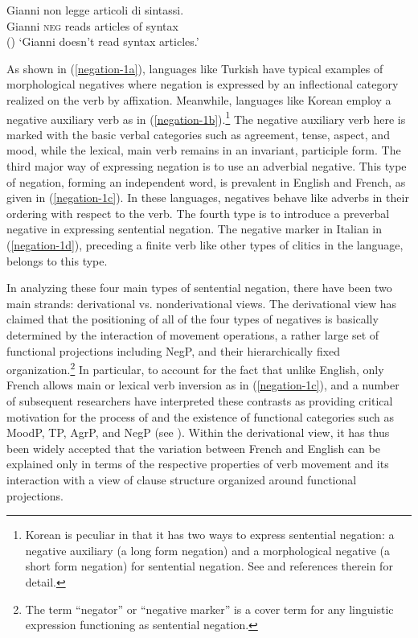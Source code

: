 \documentclass[output=paper
                ,modfonts
                ,nonflat
	        ,collection
	        ,collectionchapter
	        ,collectiontoclongg
 	        ,biblatex
                ,babelshorthands
                ,newtxmath
                ,draftmode
                ,colorlinks, citecolor=brown
]{./langsci/langscibook}
\begin{document}
{\ex \label{negation-1d} %
\gll Gianni non legge articoli di sintassi. \\
Gianni \textsc{neg} reads articles of syntax \\\hfill () 
\glt `Gianni doesn't read syntax articles.'
\zl

\noindent
As shown in (\ref{negation-1a}), languages like Turkish
have typical examples of morphological negatives where
negation is expressed by an inflectional category realized on the
verb by affixation. Meanwhile, languages like Korean
 employ a negative auxiliary verb as in (\ref{negation-1b}).\footnote{Korean
 is peculiar in that it has two ways to
 express sentential negation: a negative auxiliary (a long form
 negation)  and a morphological negative (a short form negation)
 for sentential negation. See \citet{Kim:00,Kim:16} and references therein for detail.}
  The negative auxiliary
 verb here is marked with the basic verbal categories such as agreement, tense, aspect, and mood, while the lexical, main verb remains in an invariant, participle form. The third major way of expressing negation is to use an adverbial
negative. This type of negation, forming an independent word, is prevalent in English and French, as given in (\ref{negation-1c}). In these languages, negatives behave like adverbs in their ordering with respect to the verb. The fourth
type is to introduce a preverbal negative in
expressing sentential negation. The negative marker in Italian in (\ref{negation-1d}), preceding a finite verb like other types of clitics in the language,
belongs to this type.


In analyzing these four main types of sentential negation, there have been two main strands: derivational vs. nonderivational views. The derivational view has claimed that the positioning of all of the
four types of negatives is basically determined by the interaction of movement
operations, a rather large set of functional projections including NegP,
and their hierarchically fixed organization.\footnote{The term ``negator'' or ``negative marker'' is a cover term for any linguistic expression functioning as sentential negation.}
In particular, to account for the
fact that unlike English, only French allows main or lexical verb inversion
as in (\ref{negation-1c}), \citet{Pollock:89,Pollock:94} and a number of subsequent researchers
have interpreted these contrasts as providing critical motivation for
the process of  and the existence of functional
categories such as MoodP, TP, AgrP, and NegP (see \citealt{Belletti:90, Zanuttini:91, Zanuttini:97,Zanuttini:01, Chomsky:91,Chomsky:93,Chomsky:95, Lasnik:95, Haegeman:95,Haegeman:97, Vikner97a-u, Zeijlstra:15}).
Within the derivational view, it has thus been widely
accepted that the variation between French and English can be explained only in terms of the respective properties of verb movement and its interaction with a view of clause
structure organized around functional projections.


}
\end{document}
